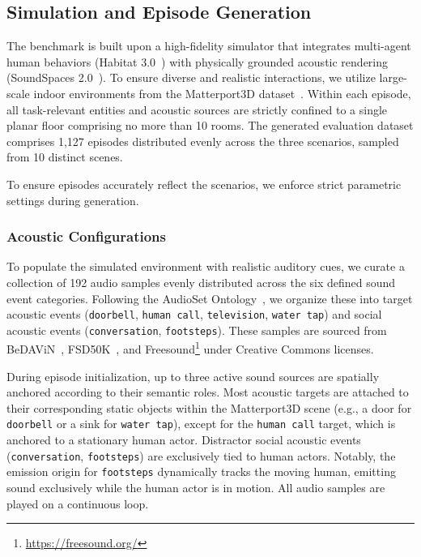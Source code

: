 \subsection{Simulation and Episode Generation}
\label{subsec:benchmark-sim}

The benchmark is built upon a high-fidelity simulator that integrates multi-agent human behaviors (Habitat 3.0~\cite{Habitat30Cohabitat2023}) with physically grounded acoustic rendering (SoundSpaces 2.0~\cite{SoundSpaces20Simulation2022}). To ensure diverse and realistic interactions, we utilize large-scale indoor environments from the Matterport3D dataset~\cite{Matterport3DLearningRGBD2017}. Within each episode, all task-relevant entities and acoustic sources are strictly confined to a single planar floor comprising no more than 10 rooms. The generated evaluation dataset comprises 1,127 episodes distributed evenly across the three scenarios, sampled from 10 distinct scenes.

To ensure episodes accurately reflect the scenarios, we enforce strict parametric settings during generation.

\subsubsection{Acoustic Configurations}
To populate the simulated environment with realistic auditory cues, we curate a collection of 192 audio samples evenly distributed across the six defined sound event categories. Following the AudioSet Ontology~\cite{AudioSetOntology2017}, we organize these into target acoustic events (\texttt{doorbell}, \texttt{human call}, \texttt{television}, \texttt{water tap}) and social acoustic events (\texttt{conversation}, \texttt{footsteps}). These samples are sourced from BeDAViN~\cite{AudiovisualNavigationNoisy2025}, FSD50K~\cite{FSD50KOpenDataset2022}, and Freesound\footnote{\url{https://freesound.org/}} under Creative Commons licenses.

During episode initialization, up to three active sound sources are spatially anchored according to their semantic roles. Most acoustic targets are attached to their corresponding static objects within the Matterport3D scene (e.g., a door for \texttt{doorbell} or a sink for \texttt{water tap}), except for the \texttt{human call} target, which is anchored to a stationary human actor. Distractor social acoustic events (\texttt{conversation}, \texttt{footsteps}) are exclusively tied to human actors. Notably, the emission origin for \texttt{footsteps} dynamically tracks the moving human, emitting sound exclusively while the human actor is in motion. All audio samples are played on a continuous loop.

